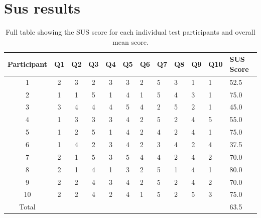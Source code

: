 \section{Sus results}\label{appendix:susResults}
\begin{table}[]
	\centering
	\caption{Full table showing the SUS score for each individual test participants and overall mean score.}
	\label{tab:susScoreTableAppendix}
	\begin{tabular}{|c|c|c|c|c|c|l|l|l|l|l|l|}
		\hline
		Participant & Q1 & Q2 & Q3 & Q4 & Q5 & Q6 & Q7 & Q8 & Q9 & Q10 & SUS Score \\ \hline
		1           & 2  & 3  & 2  & 3  & 3  & 2  & 5  & 3  & 1  & 1   & 52.5      \\ \hline
		2           & 1  & 1  & 5  & 1  & 4  & 1  & 5  & 4  & 3  & 1   & 75.0      \\ \hline
		3           & 3  & 4  & 4  & 4  & 5  & 4  & 2  & 5  & 2  & 1   & 45.0      \\ \hline
		4           & 1  & 3  & 3  & 3  & 4  & 2  & 5  & 2  & 4  & 5   & 55.0      \\ \hline
		5           & 1  & 2  & 5  & 1  & 4  & 2  & 4  & 2  & 4  & 1   & 75.0      \\ \hline
		6           & 1  & 4  & 2  & 3  & 4  & 2  & 3  & 4  & 2  & 4   & 37.5      \\ \hline
		7           & 2  & 1  & 5  & 3  & 5  & 4  & 4  & 2  & 4  & 2   & 70.0      \\ \hline
		8           & 2  & 1  & 4  & 1  & 3  & 2  & 5  & 1  & 4  & 1   & 80.0      \\ \hline
		9           & 2  & 2  & 4  & 3  & 4  & 2  & 5  & 2  & 4  & 2   & 70.0      \\ \hline
		10          & 2  & 2  & 4  & 2  & 4  & 1  & 5  & 2  & 5  & 3   & 75.0      \\ \hline
		Total       &    &    &    &    &    &    &    &    &    &     & 63.5      \\ \hline
	\end{tabular}
\end{table}